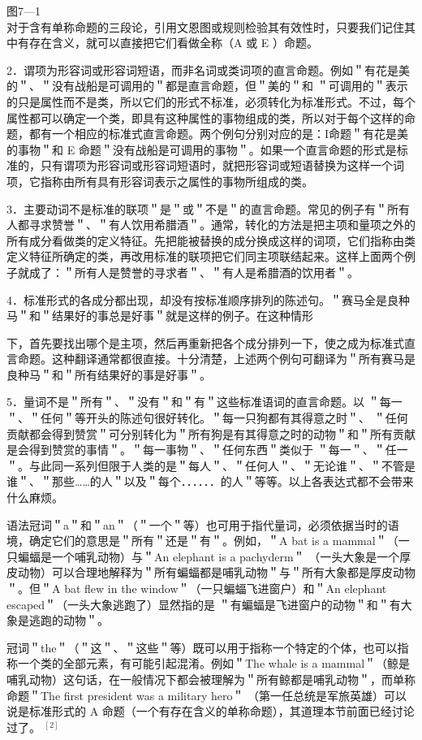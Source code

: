 图7—1\\
对于含有单称命题的三段论，引用文恩图或规则检验其有效性时，只要我们记住其中有存在含义，就可以直接把它们看做全称（A 或 E ）命题。

2．谓项为形容词或形容词短语，而非名词或类词项的直言命题。例如＂有花是美的＂、＂没有战船是可调用的＂都是直言命题，但＂美的＂和 ＂可调用的＂表示的只是属性而不是类，所以它们的形式不标准，必须转化为标准形式。不过，每个属性都可以确定一个类，即具有这种属性的事物组成的类，所以对于每个这样的命题，都有一个相应的标准式直言命题。两个例句分别对应的是：I命题＂有花是美的事物＂和 E 命题＂没有战船是可调用的事物＂。如果一个直言命题的形式是标准的，只有谓项为形容词或形容词短语时，就把形容词或短语替换为这样一个词项，它指称由所有具有形容词表示之属性的事物所组成的类。

3．主要动词不是标准的联项＂是＂或＂不是＂的直言命题。常见的例子有＂所有人都寻求赞誉＂、＂有人饮用希腊酒＂。通常，转化的方法是把主项和量项之外的所有成分看做类的定义特征。先把能被替换的成分换成这样的词项，它们指称由类定义特征所确定的类，再改用标准的联项把它们同主项联结起来。这样上面两个例子就成了：＂所有人是赞誉的寻求者＂、＂有人是希腊酒的饮用者＂。

4．标准形式的各成分都出现，却没有按标准顺序排列的陈述句。＂赛马全是良种马＂和＂结果好的事总是好事＂就是这样的例子。在这种情形

下，首先要找出哪个是主项，然后再重新把各个成分排列一下，使之成为标准式直言命题。这种翻译通常都很直接。十分清楚，上述两个例句可翻译为＂所有赛马是良种马＂和＂所有结果好的事是好事＂。

5．量词不是＂所有＂、＂没有＂和＂有＂这些标准语词的直言命题。以 ＂每一＂、＂任何＂等开头的陈述句很好转化。＂每一只狗都有其得意之时＂、 ＂任何贡献都会得到赞赏＂可分别转化为＂所有狗是有其得意之时的动物＂和＂所有贡献是会得到赞赏的事情＂。＂每一事物＂、＂任何东西＂类似于 ＂每一＂、＂任一＂。与此同一系列但限于人类的是＂每人＂、＂任何人＂、＂无论谁＂、＂不管是谁＂、＂那些……的人＂以及＂每个．．．．．．的人＂等等。以上各表达式都不会带来什么麻烦。

语法冠词＂a＂和＂an＂（＂一个＂等）也可用于指代量词，必须依据当时的语境，确定它们的意思是＂所有＂还是＂有＂。例如，＂A bat is a mammal＂（一只蝙蝠是一个哺乳动物）与＂An elephant is a pachyderm＂ （一头大象是一个厚皮动物）可以合理地解释为＂所有蝙蝠都是哺乳动物＂与＂所有大象都是厚皮动物＂。但＂A bat flew in the window＂（一只蝙蝠飞进窗户）和＂An elephant escaped＂（一头大象逃跑了）显然指的是 ＂有蝙蝠是飞进窗户的动物＂和＂有大象是逃跑的动物＂。

冠词＂the＂（＂这＂、＂这些＂等）既可以用于指称一个特定的个体，也可以指称一个类的全部元素，有可能引起混淆。例如＂The whale is a mammal＂（鲸是哺乳动物）这句话，在一般情况下都会被理解为＂所有鲸都是哺乳动物＂，而单称命题＂The first president was a military hero＂ （第一任总统是军旅英雄）可以说是标准形式的 A 命题（一个有存在含义的单称命题），其道理本节前面已经讨论过了。 ${ }^{[2]}$

